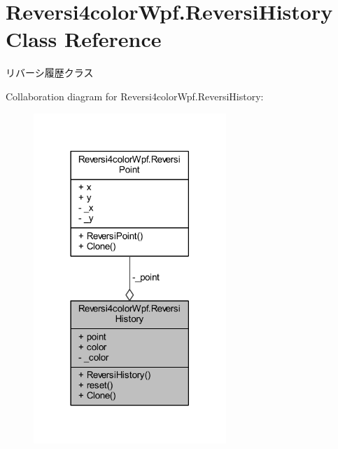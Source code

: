 \hypertarget{class_reversi4color_wpf_1_1_reversi_history}{}\section{Reversi4color\+Wpf.\+Reversi\+History Class Reference}
\label{class_reversi4color_wpf_1_1_reversi_history}


リバーシ履歴クラス  




Collaboration diagram for Reversi4color\+Wpf.\+Reversi\+History\+:\nopagebreak
\begin{figure}[H]
\begin{center}
\leavevmode
\includegraphics[width=206pt]{class_reversi4color_wpf_1_1_reversi_history__coll__graph}
\end{center}
\end{figure}
